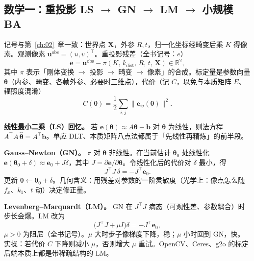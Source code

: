 \subsection{数学一：重投影 LS $\to$ GN $\to$ LM $\to$ 小规模 BA}
\label{sec:ch03-ba}

记号与第~\ref{ch:02}~章一致：世界点 $\boldsymbol X$，外参 $R,t$，归一化坐标经畸变后乘 $K$ 得像素。观测像素 $\boldsymbol u^{\mathrm{obs}}=(u,v)^\top$。重投影残差（全书记号：$e$）
\begin{equation}
  \boldsymbol e = \boldsymbol u^{\mathrm{obs}} - \pi(K,\,k_{\mathrm{dist}},\,R,\,t,\,\boldsymbol X)\in\mathbb{R}^2,
  \label{eq:ch03-residual}
\end{equation}
其中 $\pi$ 表示「刚体变换 $\to$ 投影 $\to$ 畸变 $\to$ 像素」的合成。标定量是参数向量 $\boldsymbol\theta$（内参、畸变、各帧外参、必要时三维点），代价（记 $C$，以免与本质矩阵 $E$、辐照度混淆）
\begin{equation}
  C(\boldsymbol\theta)=\frac12\sum_{i,j}\|\boldsymbol e_{ij}(\boldsymbol\theta)\|^2.
  \label{eq:ch03-cost}
\end{equation}

\textbf{线性最小二乘（LS）回忆。} 若 $\boldsymbol e(\boldsymbol\theta)\approx A\boldsymbol\theta-\boldsymbol b$ 对 $\boldsymbol\theta$ 为线性，则法方程 $A^\top A\,\hat{\boldsymbol\theta}=A^\top\boldsymbol b$。单应 DLT、本质矩阵八点法都属于「先线性再精炼」的前半段。

\textbf{Gauss--Newton（GN）。} $\pi$ 对 $\boldsymbol\theta$ 非线性。在当前估计 $\boldsymbol\theta_0$ 处线性化 $\boldsymbol e(\boldsymbol\theta_0+\delta)\approx\boldsymbol e_0+J\delta$，其中 $J=\partial\boldsymbol e/\partial\boldsymbol\theta$。令线性化后的代价对 $\delta$ 最小，得
\begin{equation}
  J^\top J\,\delta = -J^\top\boldsymbol e_0.
  \label{eq:ch03-gn}
\end{equation}
更新 $\boldsymbol\theta\leftarrow\boldsymbol\theta_0+\delta$。几何含义：用残差对参数的一阶灵敏度（光学上：像点怎么随 $f_x$、$k_1$、$t$ 动）决定修正量。

\textbf{Levenberg--Marquardt（LM）。} GN 在 $J^\top J$ 病态（可观性差、参数耦合）时步长会爆。LM 改为
\begin{equation}
  \bigl(J^\top J+\mu I\bigr)\delta = -J^\top\boldsymbol e_0,
  \label{eq:ch03-lm}
\end{equation}
$\mu>0$ 为阻尼（全书记号）。$\mu$ 大时步子像梯度下降，稳；$\mu$ 小时回到 GN，快。实操：若代价 $C$ 下降则减小 $\mu$，否则增大 $\mu$ 重试。OpenCV、Ceres、g2o 的标定后端本质上都是带稀疏结构的 LM。

